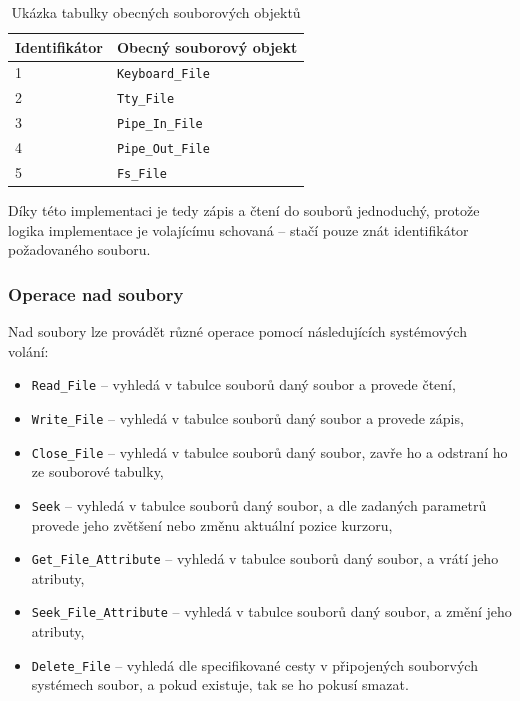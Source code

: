 \documentclass[12pt, a4paper]{article}
\begin{document}
\begin{table}[ht]
\centering
\begin{tabular}{|l|l|}
\hline
\textbf{Identifikátor} & \textbf{Obecný souborový objekt} \\ \hline
1                      & \texttt{Keyboard\_File}                   \\ \hline
2                      & \texttt{Tty\_File}                        \\ \hline
3                      & \texttt{Pipe\_In\_File}                   \\ \hline
4                      & \texttt{Pipe\_Out\_File}                  \\ \hline
5                      & \texttt{Fs\_File}                         \\ \hline
\end{tabular}
\caption{Ukázka tabulky obecných souborových objektů}
\end{table}

Díky této implementaci je tedy zápis a čtení do souborů jednoduchý, protože logika implementace je volajícímu schovaná -- stačí pouze znát identifikátor požadovaného souboru.

\subsubsection{Operace nad soubory}
Nad soubory lze provádět různé operace pomocí následujících systémových volání:

\begin{itemize}
    \item \texttt{Read\_File} -- vyhledá v tabulce souborů daný soubor a provede čtení,
    \item \texttt{Write\_File} -- vyhledá v tabulce souborů daný soubor a provede zápis,
    \item \texttt{Close\_File} -- vyhledá v tabulce souborů daný soubor, zavře ho a odstraní ho ze souborové tabulky,
    \item \texttt{Seek} -- vyhledá v tabulce souborů daný soubor, a dle zadaných parametrů provede jeho zvětšení nebo změnu aktuální pozice kurzoru,
    \item \texttt{Get\_File\_Attribute} -- vyhledá v tabulce souborů daný soubor, a vrátí jeho atributy,
    \item \texttt{Seek\_File\_Attribute} -- vyhledá v tabulce souborů daný soubor, a změní jeho atributy, 
    \item \texttt{Delete\_File} -- vyhledá dle specifikované cesty v připojených souborvých systémech soubor, a pokud existuje, tak se ho pokusí smazat.
\end{itemize}
\end{document}
